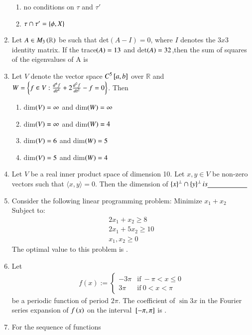 \documentclass[journal]{IEEEtran}
\begin{document}
\begin{enumerate}
\begin{enumerate}
      \item no conditions on $\tau$ and $\tau'$
      \item $\tau \cap \tau' = \left\{\phi, X\right\}$
  \end{enumerate}
  \item Let $A \in M_3\left(\mathbb{R}\right)$ be such that det$(A-I) = 0$, where $I$ denotes the $3 x 3$ identity matrix. If the trace$\left(A\right) = 13$ and det$\left(A\right) = 32$,then the sum of squares of the eigenvalues of A is \underline{\hspace{2cm}} 
  \item Let $V$ denote the vector space $C^5{}\left[a,b\right]$ over $\mathbb{R}$ and $W = \left\{ f \in V : \frac{d^4 f}{dt^4} + 2 \frac{d^2 f}{dt^2} - f = 0\right\}$. Then
  \begin{enumerate}
    \item dim$\left(V\right) = \infty$ and dim$\left(W\right) = \infty$
    \item dim$\left(V\right) = \infty$ and dim$\left(W\right) = 4$
    \item dim$\left(V\right) = 6$ and dim$\left(W\right) = 5$
    \item dim$\left(V\right) = 5$ and dim$\left(W\right) = 4$
\end{enumerate}
\item Let $V$ be a real inner product space of dimension 10. Let $x, y \in V$ be non-zero vectors such that $\langle x, y \rangle = 0$. Then the dimension of $\left\{x\right\}^\perp \cap \left\{y\right\}^\perp is \underline{\hspace{2cm}}$
\item Consider the following linear programming problem: Minimize $x_1 + x_2$ Subject to:
\begin{align}
2x_1 + x_2 \geq 8 \\ 2x_1 + 5x_2 \geq 10 \\ x_1, x_2 \geq 0
\end{align}
The optimal value to this problem is \underline{\hspace{2cm}}.
\item Let \begin{align} 
f(x) :=\begin{cases}
-3\pi & \text{if} \ -\pi < x \leq 0 \\
3\pi & \text{if} \ 0 < x < \pi
\end{cases} 
\end{align} 
be a periodic function of period $2\pi$. The coefficient of $\sin 3x$ in the Fourier series expansion of $f\left(x\right)$ on the interval ${}\left[-\pi, \pi\right]$ is \underline{\hspace{2cm}}. \item For the sequence of functions 

\end{enumerate}
\end{document}
